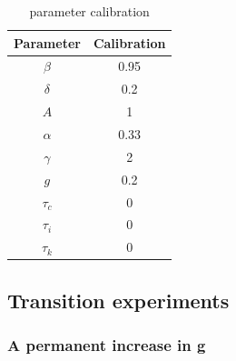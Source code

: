\documentclass[a4paper,12pt]{scrartcl} %
\begin{document}
\begin{table}[h]
\centering\caption{parameter calibration}\label{6}
\begin{tabular}{cc}
  \hline
  Parameter&Calibration\\
  \hline
  $\beta$&0.95\\
  $\delta$&0.2\\
  $A$&1\\
  $\alpha$&0.33\\
  $\gamma$&2\\
  $g$&0.2\\
  $\tau_c$&0\\
  $\tau_i$&0\\
  $\tau_k$&0\\
  \hline
  \end{tabular}
\end{table}

\subsection{Transition experiments}
\subsubsection{A permanent increase in g}
\end{document}
